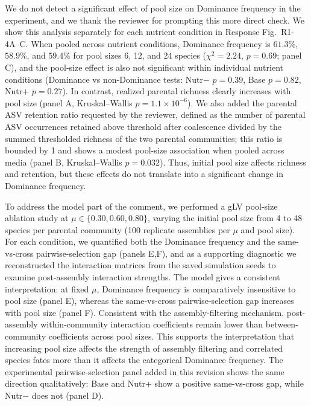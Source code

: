 \responselabel
We do not detect a significant effect of pool size on Dominance frequency in the experiment, and we thank the reviewer for prompting this more direct check. We show this analysis separately for each nutrient condition in Response Fig.~R1-4A--C. When pooled across nutrient conditions, Dominance frequency is $61.3\%$, $58.9\%$, and $59.4\%$ for pool sizes 6, 12, and 24 species ($\chi^2 = 2.24$, $p = 0.69$; panel C), and the pool-size effect is also not significant within individual nutrient conditions (Dominance vs non-Dominance tests: Nutr$-$ $p = 0.39$, Base $p = 0.82$, Nutr$+$ $p = 0.27$). In contrast, realized parental richness clearly increases with pool size (panel A, Kruskal--Wallis $p = 1.1 \times 10^{-6}$). We also added the parental ASV retention ratio requested by the reviewer, defined as the number of parental ASV occurrences retained above threshold after coalescence divided by the summed thresholded richness of the two parental communities; this ratio is bounded by 1 and shows a modest pool-size association when pooled across media (panel B, Kruskal--Wallis $p = 0.032$). Thus, initial pool size affects richness and retention, but these effects do not translate into a significant change in Dominance frequency.


To address the model part of the comment, we performed a gLV pool-size ablation study at $\mu \in \{0.30, 0.60, 0.80\}$, varying the initial pool size from 4 to 48 species per parental community (100 replicate assemblies per $\mu$ and pool size). For each condition, we quantified both the Dominance frequency and the same-vs-cross pairwise-selection gap (panels E,F), and as a supporting diagnostic we reconstructed the interaction matrices from the saved simulation seeds to examine post-assembly interaction strengths. The model gives a consistent interpretation: at fixed $\mu$, Dominance frequency is comparatively insensitive to pool size (panel E), whereas the same-vs-cross pairwise-selection gap increases with pool size (panel F). Consistent with the assembly-filtering mechanism, post-assembly within-community interaction coefficients remain lower than between-community coefficients across pool sizes. This supports the interpretation that increasing pool size affects the strength of assembly filtering and correlated species fates more than it affects the categorical Dominance frequency. The experimental pairwise-selection panel added in this revision shows the same direction qualitatively: Base and Nutr$+$ show a positive same-vs-cross gap, while Nutr$-$ does not (panel D).

